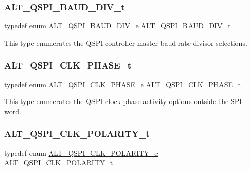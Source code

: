 \subsubsection{\texorpdfstring{ALT\_QSPI\_BAUD\_DIV\_t}{ALT\_QSPI\_BAUD\_DIV\_t}}
{\footnotesize\ttfamily typedef enum \mbox{\hyperlink{group__ALT__QSPI__DEV__CFG_gabea2bac97b47b7da32cf093e97de90e8}{A\+L\+T\+\_\+\+Q\+S\+P\+I\+\_\+\+B\+A\+U\+D\+\_\+\+D\+I\+V\+\_\+e}}  \mbox{\hyperlink{group__ALT__QSPI__DEV__CFG_ga5a183c627f4dc5f1469a227c748b01ec}{A\+L\+T\+\_\+\+Q\+S\+P\+I\+\_\+\+B\+A\+U\+D\+\_\+\+D\+I\+V\+\_\+t}}}

This type enumerates the Q\+S\+PI controller master baud rate divisor selections. \mbox{\label{group__ALT__QSPI__DEV__CFG_ga96e07c567fa1c448c58c463c4068a136}} 
\subsubsection{\texorpdfstring{ALT\_QSPI\_CLK\_PHASE\_t}{ALT\_QSPI\_CLK\_PHASE\_t}}
{\footnotesize\ttfamily typedef enum \mbox{\hyperlink{group__ALT__QSPI__DEV__CFG_ga88c43312b86922e74346d404644293fb}{A\+L\+T\+\_\+\+Q\+S\+P\+I\+\_\+\+C\+L\+K\+\_\+\+P\+H\+A\+S\+E\+\_\+e}}  \mbox{\hyperlink{group__ALT__QSPI__DEV__CFG_ga96e07c567fa1c448c58c463c4068a136}{A\+L\+T\+\_\+\+Q\+S\+P\+I\+\_\+\+C\+L\+K\+\_\+\+P\+H\+A\+S\+E\+\_\+t}}}

This type enumerates the Q\+S\+PI clock phase activity options outside the S\+PI word. \mbox{\label{group__ALT__QSPI__DEV__CFG_ga4255485b5b3ba0a98cb3294b3bebbc8f}} 
\subsubsection{\texorpdfstring{ALT\_QSPI\_CLK\_POLARITY\_t}{ALT\_QSPI\_CLK\_POLARITY\_t}}
{\footnotesize\ttfamily typedef enum \mbox{\hyperlink{group__ALT__QSPI__DEV__CFG_ga502f6a88a9d3e4e133385beabcb27487}{A\+L\+T\+\_\+\+Q\+S\+P\+I\+\_\+\+C\+L\+K\+\_\+\+P\+O\+L\+A\+R\+I\+T\+Y\+\_\+e}}  \mbox{\hyperlink{group__ALT__QSPI__DEV__CFG_ga4255485b5b3ba0a98cb3294b3bebbc8f}{A\+L\+T\+\_\+\+Q\+S\+P\+I\+\_\+\+C\+L\+K\+\_\+\+P\+O\+L\+A\+R\+I\+T\+Y\+\_\+t}}}

